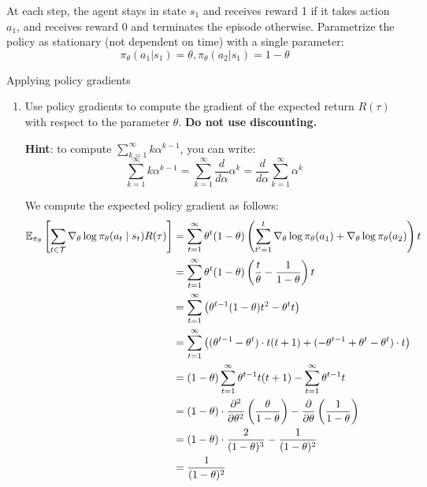 \documentclass{article}
\begin{document}
At each step, the agent stays in state $s_1$ and receives reward 1 if it takes action $a_1$, and receives reward 0 and terminates the episode otherwise.
Parametrize the policy as stationary (not dependent on time) with a single parameter:
\[\pi_\theta(a_1|s_1) = \theta, \pi_\theta(a_2|s_1) = 1-\theta\]

\begin{enumerate}
 Applying policy gradients
\begin{enumerate}
    \item Use policy gradients to compute the gradient of the expected return $R(\tau)$ with respect to the parameter $\theta$. \textbf{Do not use discounting.}

    \textbf{Hint}: to compute $\sum_{k=1}^\infty k\alpha^{k-1}$, you can write:
    \[\sum_{k=1}^\infty k\alpha^{k-1} = \sum_{k=1}^\infty \frac{d}{d\alpha}\alpha^k = \frac{d}{d\alpha}\sum_{k=1}^\infty\alpha^k\]

    \begin{sol}
We compute the expected policy gradient as follows: 
\begin{align*}
    \mathbb{E}_{\pi_\theta}\left[\sum_{t \in \mathcal{T}} \nabla_\theta \log \pi_\theta(a_t \mid s_t) R(\tau)\right] &= \sum_{t=1}^{\infty} \theta^t (1 - \theta) \left(\sum_{t'=1}^t \nabla_\theta \log \pi_\theta(a_1) + \nabla_\theta \log \pi_\theta (a_2)\right)t \\
    &= \sum_{t=1}^\infty \theta^t (1 - \theta) \left(\frac{t}{\theta} - \frac{1}{1 - \theta}\right) t \\
    &= \sum_{t=1}^\infty \left(\theta^{t-1} (1 - \theta) t^2 - \theta^t t\right) \\
    &= \sum_{t=1}^\infty \left((\theta^{t-1} - \theta^t) \cdot t(t+1) + (-\theta^{t-1} + \theta^t - \theta^t) \cdot t\right) \\
    &= (1 - \theta) \sum_{t=1}^{\infty} \theta^{t-1} t(t+1) - \sum_{t=1}^{\infty} \theta^{t-1} t \\
    &= (1 - \theta) \cdot \frac{\partial^2}{\partial \theta^2} \left(\frac{\theta}{1 - \theta}\right) - \frac{\partial }{\partial \theta} \left( \frac{1}{1 - \theta}\right) \\
    &= (1 - \theta) \cdot \frac{2}{(1 - \theta)^3} - \frac{1}{(1 - \theta)^2} \\
    &= \frac{1}{(1 - \theta)^2}
\end{align*}
    \end{sol}

    \newpage
    

\end{enumerate}
\end{enumerate}
\end{document}
